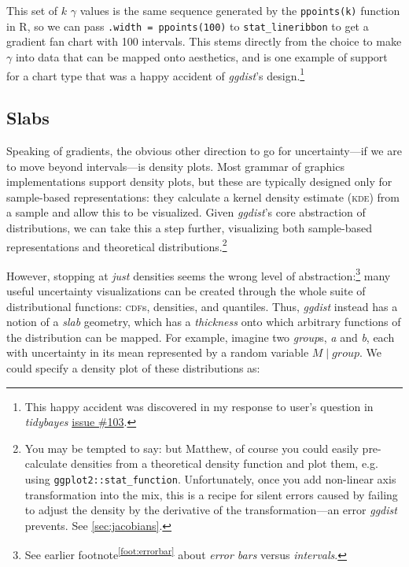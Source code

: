 \documentclass[journal]{vgtc}              %
\begin{document}
This set of $k$  $\gamma$ values is the same sequence generated by the \texttt{ppoints(k)} function in R, so we can pass \texttt{.width = ppoints(100)} to \texttt{stat\_lineribbon} to get a gradient fan chart with 100 intervals. This stems directly from the choice to make $\gamma$ into data that can be mapped onto aesthetics, and is one example of support for a chart type that was a happy accident of \textit{ggdist}'s design.\footnote{This happy accident was discovered in my response to user's question in \textit{tidybayes} \href{https://github.com/mjskay/tidybayes/issues/103}{issue \#103}.}

\subsection{Slabs}

Speaking of gradients, the obvious other direction to go for uncertainty---if we are to move beyond intervals---is density plots. Most grammar of graphics implementations support density plots, but these are typically designed only for sample-based representations: they calculate a kernel density estimate (\textsc{kde}) from a sample and allow this to be visualized. Given \textit{ggdist}'s core abstraction of distributions, we can take this a step further, visualizing both sample-based representations and theoretical distributions.\footnote{\label{foot:jacobians}You may be tempted to say: but Matthew, of course you could easily pre-calculate densities from a theoretical density function and plot them, e.g. using \texttt{ggplot2::stat\_function}. Unfortunately, once you add non-linear axis transformation into the mix, this is a recipe for silent errors caused by failing to adjust the density by the derivative of the transformation---an error \textit{ggdist} prevents. See \cref{sec:jacobians}.} 

However, stopping at \textit{just} densities seems the wrong level of abstraction:\footnote{See earlier footnote\textsuperscript{\ref{foot:errorbar}} about \textit{error bars} versus \textit{intervals}.} many useful uncertainty visualizations can be created through the whole suite of distributional functions: \textsc{cdf}s, densities, and quantiles. Thus, \textit{ggdist} instead has a notion of a \textit{slab} geometry, which has a \textit{thickness} onto which arbitrary functions of the distribution can be mapped. For example, imagine two \textit{group}s, \textit{a} and \textit{b}, each with uncertainty in its mean represented by a random variable $M \mid group$. We could specify a density plot of these distributions as:
\end{document}
